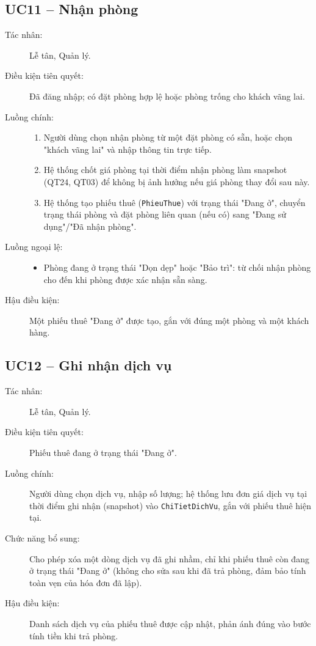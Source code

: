 \documentclass[14pt]{report}
\begin{document}
\subsection{UC11 -- Nhận phòng}
\begin{description}
  \item[Tác nhân:] Lễ tân, Quản lý.
  \item[Điều kiện tiên quyết:] Đã đăng nhập; có đặt phòng hợp lệ hoặc phòng trống cho khách vãng lai.
  \item[Luồng chính:]
  \begin{enumerate}
    \item Người dùng chọn nhận phòng từ một đặt phòng có sẵn, hoặc chọn "khách vãng lai" và nhập thông tin trực tiếp.
    \item Hệ thống chốt giá phòng tại thời điểm nhận phòng làm snapshot (QT24, QT03) để không bị ảnh hưởng nếu giá phòng thay đổi sau này.
    \item Hệ thống tạo phiếu thuê (\texttt{PhieuThue}) với trạng thái "Đang ở", chuyển trạng thái phòng và đặt phòng liên quan (nếu có) sang "Đang sử dụng"/"Đã nhận phòng".
  \end{enumerate}
  \item[Luồng ngoại lệ:]
  \begin{itemize}
    \item Phòng đang ở trạng thái "Dọn dẹp" hoặc "Bảo trì": từ chối nhận phòng cho đến khi phòng được xác nhận sẵn sàng.
  \end{itemize}
  \item[Hậu điều kiện:] Một phiếu thuê "Đang ở" được tạo, gắn với đúng một phòng và một khách hàng.
\end{description}

\subsection{UC12 -- Ghi nhận dịch vụ}
\begin{description}
  \item[Tác nhân:] Lễ tân, Quản lý.
  \item[Điều kiện tiên quyết:] Phiếu thuê đang ở trạng thái "Đang ở".
  \item[Luồng chính:] Người dùng chọn dịch vụ, nhập số lượng; hệ thống lưu đơn giá dịch vụ tại thời điểm ghi nhận (snapshot) vào \texttt{ChiTietDichVu}, gắn với phiếu thuê hiện tại.
  \item[Chức năng bổ sung:] Cho phép xóa một dòng dịch vụ đã ghi nhầm, chỉ khi phiếu thuê còn đang ở trạng thái "Đang ở" (không cho sửa sau khi đã trả phòng, đảm bảo tính toàn vẹn của hóa đơn đã lập).
  \item[Hậu điều kiện:] Danh sách dịch vụ của phiếu thuê được cập nhật, phản ánh đúng vào bước tính tiền khi trả phòng.
\end{description}
\end{document}
